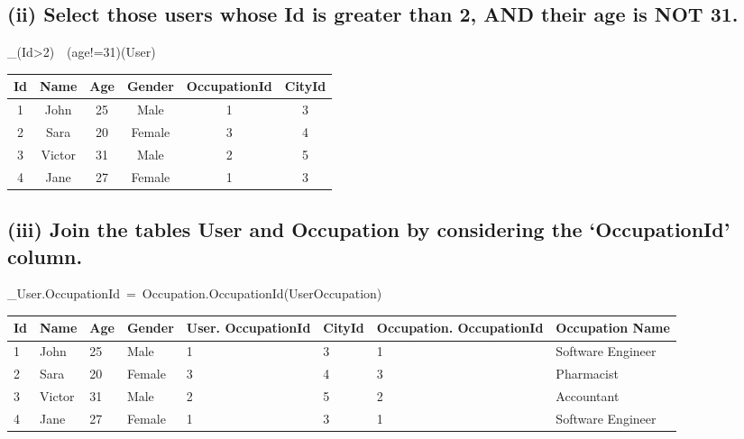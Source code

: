 \documentclass[10pt]{article}
\begin{document}
\newpage \noindent
\subsection*{(ii) Select those users whose Id is greater than 2, AND their age is NOT 31.}
\vspace{-7mm}
\begin{myequation}
\sigma_{(Id>2)~\vee~(age!=31)}(User)
\end{myequation}
\begin{table}[!ht]
    \centering
    \begin{tabular}{|c|c|c|c|c|c|}
        \hline
        Id & Name & Age & Gender & OccupationId & CityId \\
        \hline
        \hline
        1 & John & 25 & Male & 1 & 3 \\
        \hline
        2 & Sara & 20 & Female & 3 & 4 \\
        \hline
        3 & Victor & 31 & Male & 2 & 5 \\
        \hline
        4 & Jane & 27 & Female & 1 & 3 \\
        \hline
    \end{tabular}
    \label{tab:my_label2}
\end{table}

\subsection*{(iii) Join the tables User and Occupation by considering the `OccupationId' column.}
\vspace{-7mm}
\begin{myequation}
\sigma_{User.OccupationId~=~Occupation.OccupationId}(User\times Occupation)
\end{myequation}
\begin{table}[!hbt]
    \centering
    \begin{tabular}{|p{0.5cm}|p{1cm}|p{0.5cm}|p{1.5cm}|p{2.5cm}|p{1cm}|p{2.5cm}|p{2cm}|}
        \hline
        Id & Name & Age & Gender & User. OccupationId & CityId & Occupation. OccupationId & Occupation Name \\
        \hline
        \hline
        1 & John & 25 & Male & 1 & 3 & 1 & Software Engineer \\
        \hline
        2 & Sara & 20 & Female & 3 & 4 & 3 & Pharmacist \\
        \hline
        3 & Victor & 31 & Male & 2 & 5 & 2 & Accountant \\
        \hline
        4 & Jane & 27 & Female & 1 & 3 & 1 & Software Engineer \\
        \hline
    \end{tabular}
    \label{tab:my_label2}
\end{table}
\end{document}
